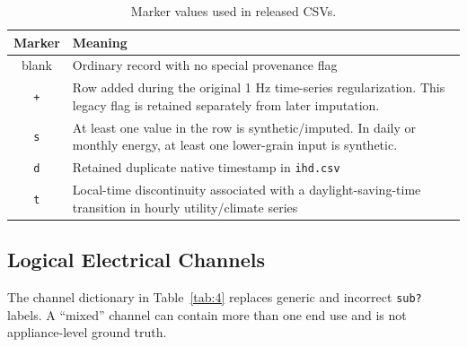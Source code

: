 \documentclass{IEEEoj-data}
\begin{document}
\begin{table}[t]
\centering
\caption{Marker values used in released CSVs.}
\label{tab:markers}
\scriptsize
\begin{tabularx}{\columnwidth}{cY}
\toprule
Marker & Meaning \\
\midrule
blank & Ordinary record with no special provenance flag \\
\texttt{+} & Row added during the original 1 Hz time-series regularization. This legacy flag is retained separately from later imputation. \\
\texttt{s} & At least one value in the row is synthetic/imputed. In daily or monthly energy, at least one lower-grain input is synthetic. \\
\texttt{d} & Retained duplicate native timestamp in \texttt{ihd.csv} \\
\texttt{t} & Local-time discontinuity associated with a daylight-saving-time transition in hourly utility/climate series \\
\bottomrule
\end{tabularx}
\end{table}

\subsection{Logical Electrical Channels}
The channel dictionary in Table~\ref{tab:4} replaces generic and incorrect \texttt{sub?} labels. A ``mixed'' channel can contain more than one end use and is not appliance-level ground truth.
\end{document}
